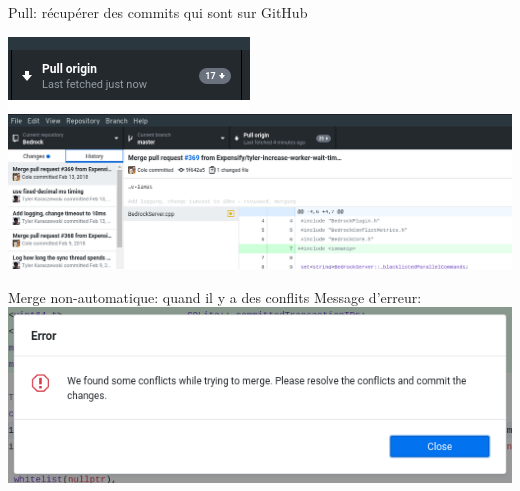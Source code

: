\documentclass{beamer}
\begin{document}
\begin{frame}{Pull: récupérer des commits qui sont sur GitHub}
    
	\begin{center}
	 	   \includegraphics[scale=0.35]{img/github_desktop/pull.png}\\
	 	   \includegraphics[scale=0.35]{img/github_desktop/pull_2.png}
	\end{center}
\end{frame}

\begin{frame}{Merge non-automatique: quand il y a des conflits}
    Message d'erreur:\\
	 	   \includegraphics[scale=0.5]{img/github_desktop/conflit_1.png}
\end{frame}
\end{document}
